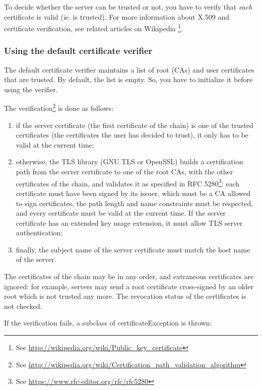To decide whether the server can be trusted or not, you have to verify that
\emph{each} certificate is valid (ie. is trusted). For more information
about X.509 and certificate verification, see related articles on Wikipedia
\footnote{See \url{http://wikipedia.org/wiki/Public\_key\_certificate}}.

\subsubsection{Using the default certificate verifier} %

The default certificate verifier maintains a list of root (CAs) and user
certificates that are trusted. By default, the list is empty. So, you have
to initialize it before using the verifier.

The verification\footnote{See
\url{http://wikipedia.org/wiki/Certification\_path\_validation\_algorithm}}
is done as follows:

\begin{enumerate}
\item if the server certificate (the first certificate of the chain) is one of
the trusted certificates (the certificates the user has decided to trust), it
only has to be valid at the current time;
\item otherwise, the TLS library (GNU TLS or OpenSSL) builds a certification
path from the server certificate to one of the root CAs, with the other
certificates of the chain, and validates it as specified in RFC
5280\footnote{See \url{https://www.rfc-editor.org/rfc/rfc5280}}: each
certificate must have been signed by its issuer, which must be a CA allowed to
sign certificates, the path length and name constraints must be respected, and
every certificate must be valid at the current time. If the server certificate
has an extended key usage extension, it must allow TLS server authentication;
\item finally, the subject name of the server certificate must match the host
name of the server.
\end{enumerate}

The certificates of the chain may be in any order, and extraneous certificates
are ignored: for example, servers may send a root certificate cross-signed by
an older root which is not trusted any more. The revocation status of the
certificates is not checked.

If the verification fails, a subclass of {\vcode certificateException} is
thrown:

